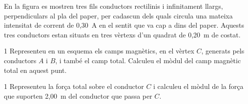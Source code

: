 En la figura es mostren tres fils conductors rectilinis i infinitament llargs, perpendiculars al pla del paper, per cadascun dels quals circula una mateixa intensitat de corrent de 0,30~A en el sentit que va cap a dins del paper. Aquests tres conductors estan situats en tres vèrtexs d'un quadrat de 0,20~m de costat.


\begin{apartat}{1}
Representeu en un esquema els camps magnètics, en el vèrtex $C$, generats pels conductors $A$ i $B$, i també el camp total. Calculeu el mòdul del camp magnètic total en aquest punt.
\end{apartat}

\begin{apartat}{1}
Representeu la força total sobre el conductor $C$ i calculeu el mòdul de la força que suporten 2,00~m del conductor que passa per $C$.
\end{apartat}


